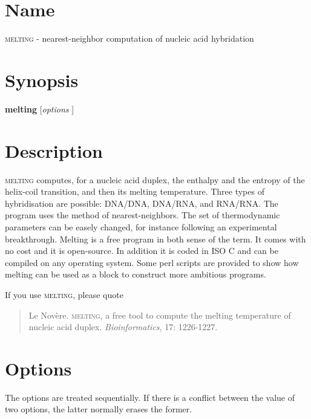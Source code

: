 \documentclass{article}
\begin{document}
 
\section{Name }
\textsc{melting} - nearest-neighbor computation of nucleic acid hybridation
\section{Synopsis}
\textbf{melting} [\textit{options }]  
\section{Description }

\textsc{melting} computes, for a nucleic acid duplex, the enthalpy and the
entropy of the helix-coil transition, and then its melting temperature. Three
types of hybridisation are possible: DNA/DNA, DNA/RNA, and RNA/RNA. The program
uses the method of nearest-neighbors. The set of thermodynamic parameters can be
easely changed, for instance following an experimental breakthrough. Melting is
a free program in both sense of the term. It comes with no cost and it is
open-source. In addition it is coded in ISO C and can be compiled on any
operating system. Some perl scripts are provided to show how melting can be used
as a block to construct more ambitious programs.

If you use \textsc{melting}, please quote

\begin{quote}
  Le Nov\`ere. \textsc{melting}, a free tool to compute the
    melting temperature of nucleic acid duplex. \emph{Bioinformatics}, 17: 1226-1227. 
\end{quote}

\section{Options }

The options are treated sequentially. If there is a conflict between the value
of two options, the latter normally erases the former.
\end{document}
